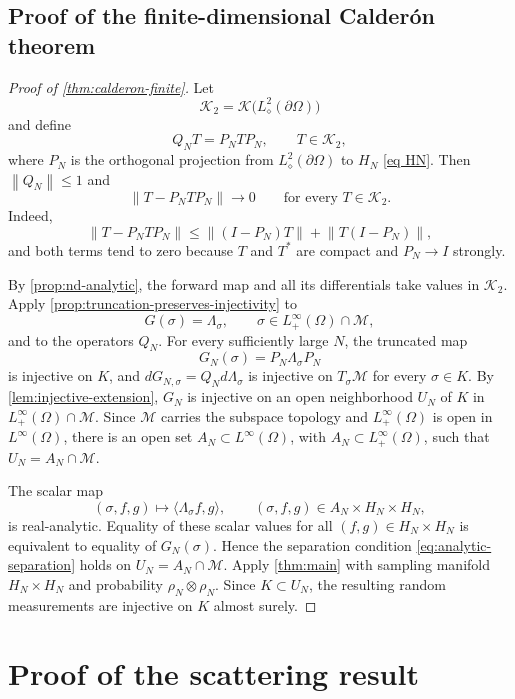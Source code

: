 \documentclass[11pt,oneside]{amsart}
\theoremstyle{plain}
\theoremstyle{definition}
\theoremstyle{remark}
\newcommand{\norm}[1]{\left\lVert #1\right\rVert}
\newcommand{\calK}{\mathcal{K}}
\newcommand{\calM}{\mathcal{M}}
\begin{document}
\subsection{Proof of the finite-dimensional Calder\'on theorem}
\begin{proof}[Proof of \cref{thm:calderon-finite}]
Let
\[
    \calK_2=\calK\bigl(L^2_\diamond(\partial\Omega)\bigr)
\]
and define
\[
    Q_NT=P_NTP_N,
    \qquad T\in\calK_2,
\]
where $P_N$ is the orthogonal projection from $L^2_\diamond(\partial\Omega)$ to $H_N$ \eqref{eq HN}.
Then $\norm{Q_N}\leq1$ and
\begin{equation}\label{eq:compact-operator-truncation}
    \norm{T-P_NTP_N}\longrightarrow0
    \qquad\text{for every }T\in\calK_2.
\end{equation}
Indeed,
\[
    \norm{T-P_NTP_N}
    \leq\norm{(I-P_N)T}+\norm{T(I-P_N)},
\]
and both terms tend to zero because $T$ and $T^*$ are compact and $P_N\to I$ strongly.

By \cref{prop:nd-analytic}, the forward map and all its differentials take values in $\calK_2$. Apply \cref{prop:truncation-preserves-injectivity} to
\[
    G(\sigma)=\Lambda_\sigma,
    \qquad \sigma\in L^\infty_+(\Omega)\cap\calM,
\]
and to the operators $Q_N$. For every sufficiently large $N$, the truncated map
\[
    G_N(\sigma)=P_N\Lambda_\sigma P_N
\]
is injective on $K$, and $dG_{N,\sigma}=Q_Nd\Lambda_\sigma$ is injective on $T_\sigma\calM$ for every $\sigma\in K$. By \cref{lem:injective-extension}, $G_N$ is injective on an open neighborhood $U_N$ of $K$ in $L^\infty_+(\Omega)\cap\calM$. Since $\calM$ carries the subspace topology and $L^\infty_+(\Omega)$ is open in $L^\infty(\Omega)$, there is an open set $A_N\subset L^\infty(\Omega)$, with $A_N\subset L^\infty_+(\Omega)$, such that $U_N=A_N\cap\calM$.

The scalar map
\[
    (\sigma,f,g)\longmapsto\langle\Lambda_\sigma f,g\rangle,
    \qquad (\sigma,f,g)\in A_N\times H_N\times H_N,
\]
is real-analytic. Equality of these scalar values for all $(f,g)\in H_N\times H_N$ is equivalent to equality of $G_N(\sigma)$. Hence the separation condition \eqref{eq:analytic-separation} holds on $U_N=A_N\cap\calM$. Apply \cref{thm:main} with sampling manifold $H_N\times H_N$ and probability $\rho_N\otimes\rho_N$. Since $K\subset U_N$, the resulting random measurements are injective on $K$ almost surely.
\end{proof}

\section{Proof of the scattering result}\label{sec:proof-scattering}
\end{document}
